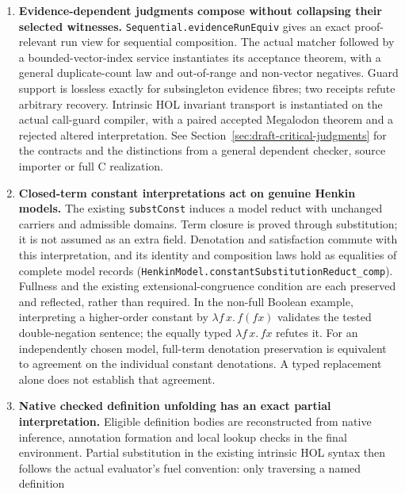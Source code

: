 \documentclass[11pt]{article}
\theoremstyle{definition}
\theoremstyle{remark}
\begin{document}
\begin{enumerate}
  These theorems concern successful runs on the supported plain term
  interpretation. They do not prove success at some fuel for every input,
  normalization completeness, raw annotation formation in general, or
  soundness of arbitrary native proof acceptance.
\item \textbf{Evidence-dependent judgments compose without collapsing
  their selected witnesses.} \nolinkurl{Sequential.evidenceRunEquiv} gives
  an exact proof-relevant run view for sequential composition. The actual
  matcher followed by a bounded-vector-index service instantiates its
  acceptance theorem, with a general duplicate-count law and out-of-range
  and non-vector negatives. Guard support is lossless exactly for
  subsingleton evidence fibres; two receipts refute arbitrary recovery.
  Intrinsic HOL invariant transport is instantiated on the actual call-guard
  compiler, with a paired accepted Megalodon theorem and a rejected altered
  interpretation. See Section~\ref{sec:draft-critical-judgments} for the
  contracts and the distinctions from a general dependent checker, source
  importer or full C realization.
\item \textbf{Closed-term constant interpretations act on genuine Henkin models.}
  The existing \nolinkurl{substConst} induces a model reduct with unchanged
  carriers and admissible domains. Term closure is proved through substitution;
  it is not assumed as an extra field. Denotation and satisfaction commute with
  this interpretation, and its identity and composition laws hold as equalities
  of complete model records
  (\nolinkurl{HenkinModel.constantSubstitutionReduct_comp}). Fullness and the
  existing extensional-congruence condition are each preserved and reflected,
  rather than required. In the non-full Boolean example, interpreting a
  higher-order constant by $\lambda f\,x.\,f(fx)$ validates the tested
  double-negation sentence; the equally typed $\lambda f\,x.\,fx$ refutes it.
  For an independently chosen model, full-term denotation preservation is
  equivalent to agreement on the individual constant denotations. A typed
  replacement alone does not establish that agreement.
\item \textbf{Native checked definition unfolding has an exact partial interpretation.}
  Eligible definition bodies are reconstructed from native inference,
  annotation formation and local lookup checks in the final environment.
  Partial substitution in the existing intrinsic HOL syntax then follows the
  actual evaluator's fuel convention: only traversing a named definition

\end{enumerate}
\end{document}
